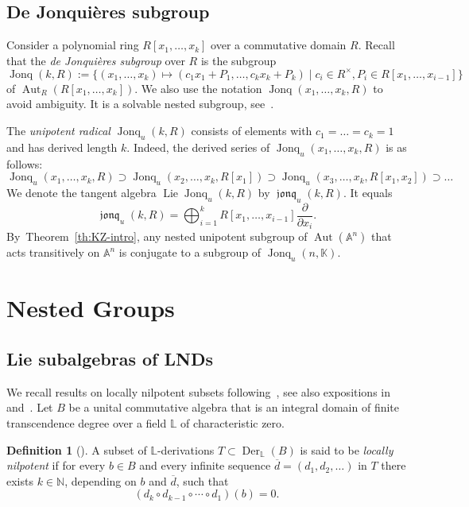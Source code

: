 \documentclass[12pt,a4paper]{amsart}
\theoremstyle{plain}
\theoremstyle{definition}
\newtheorem{definition}[theorem]{Definition}
\theoremstyle{remark}
\def\Aut{\operatorname{Aut}}
\def\Der{\operatorname{Der}}
\def\Lie{\operatorname{Lie}}
\def\AA{{\mathbb A}}
\def\NN{{\mathbb N}}
\def\K{{\mathbb K}}
\def\LL{{\mathbb L}}
\DeclareMathOperator{\Jonq}{Jonq}
\DeclareMathOperator{\jonq}{\mathfrak{jonq}}
\begin{document}
 \subsection{De Jonqui\`eres subgroup}

      Consider a polynomial ring $R[x_1,\ldots,x_k]$ over a commutative domain $R$. 
      Recall that the \emph{de Jonqui\`eres subgroup} over $R$ is the subgroup
      \[
         \Jonq(k,R):=\{(x_1,\ldots,x_k)\mapsto (c_1x_1+P_1,\ldots,c_kx_k+P_k)\mid c_i\in R^\times, P_i\in R[x_1,\ldots,x_{i-1}]\}
      \]
      of $\Aut_R(R[x_1,\ldots,x_k])$. 
      We also use the notation $\Jonq(x_1,\ldots,x_k,R)$ to avoid ambiguity.
       It is a solvable nested subgroup, see~\cite[Remark~5.2.1]{KZ}.

      The \emph{unipotent radical} $\Jonq_u(k,R)$ consists of elements with $c_1=\ldots=c_k=1$ and has derived length $k$.
      Indeed, the derived series of $\Jonq_u(x_1,\ldots,x_k,R)$ is as follows:
      \[
      \Jonq_u(x_1,\ldots,x_k,R)\supset
      \Jonq_u(x_2,\ldots,x_k,R[x_1])\supset
      \Jonq_u(x_3,\ldots,x_k,R[x_1,x_2])\supset\ldots
      \]
      We denote the tangent algebra $\Lie\Jonq_u(k,R)$ by $\jonq_u(k,R)$. It equals 
      \[
        \jonq_u(k,R)=\bigoplus_{i=1}^k R[x_1,\ldots,x_{i-1}]\frac{\partial}{\partial x_i}.
      \]
 By~Theorem~\ref{th:KZ-intro}, any nested unipotent subgroup of $\Aut(\AA^n)$ that acts transitively on $\AA^n$ is conjugate to a subgroup of $\Jonq_u(n,\K)$.


\section{Nested Groups}\label{sec:nested}

\subsection{Lie subalgebras of LNDs}\label{sec:ln-subsets}
We recall results on locally nilpotent subsets following~\cite{Skutin}, see also expositions in~\cite{DaiLN} and~\cite{BPZ}.
Let $B$ be a unital commutative algebra that is an integral domain of finite transcendence degree over a field $\mathbb{L}$ of characteristic zero.

\begin{definition}[{\cite[Definition 2]{Skutin}}]\label{def:loc-nilp}
    A subset of $\LL$-derivations $T\subset\Der_\mathbb{L}(B)$ is said to be \emph{locally nilpotent} if for every $b\in B$ and every infinite sequence $\overline{d}=(d_1,d_2,\ldots)$ in $T$ there exists $k\in\NN$, depending on $b$ and $\overline{d}$, such that \[(d_k\circ d_{k-1}\circ\cdots\circ d_1)(b)=0.\]
\end{definition}
\end{document}
